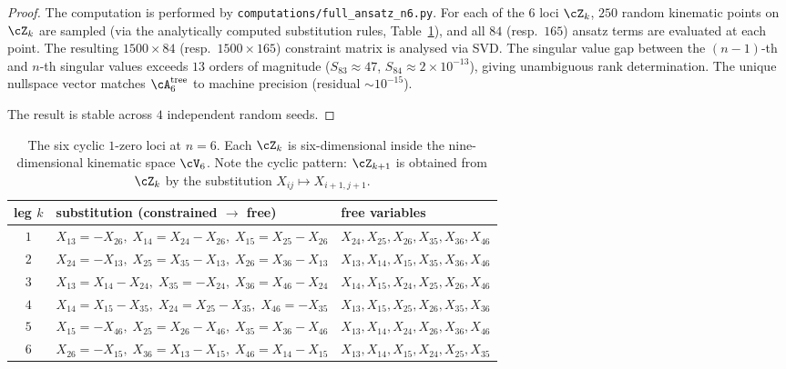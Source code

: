 \begin{proof}
The computation is performed by
\texttt{computations/full\_ansatz\_n6.py}. For each of the
$6$ loci $\cZ_k$, $250$ random kinematic points on $\cZ_k$
are sampled (via the analytically computed substitution
rules, Table~\ref{tab:loci6}), and all $84$ (resp.\ $165$)
ansatz terms are evaluated at each point. The resulting
$1500 \times 84$ (resp.\ $1500 \times 165$) constraint
matrix is analysed via SVD. The singular value gap between
the $(n{-}1)$-th and $n$-th singular values exceeds $13$
orders of magnitude ($S_{83} \approx 47$, $S_{84} \approx
2 \times 10^{-13}$), giving unambiguous rank determination.
The unique nullspace vector matches $\cA_6^{\mathrm{tree}}$
to machine precision (residual $\sim 10^{-15}$).

The result is stable across $4$ independent random seeds.
\end{proof}

\begin{table}[h]
\centering
\small
\begin{tabular}{c|l|l}
\toprule
leg $k$ & substitution (constrained $\to$ free) & free variables \\
\midrule
$1$ & $X_{13}=-X_{26},\; X_{14}=X_{24}-X_{26},\; X_{15}=X_{25}-X_{26}$
    & $X_{24},X_{25},X_{26},X_{35},X_{36},X_{46}$ \\
$2$ & $X_{24}=-X_{13},\; X_{25}=X_{35}-X_{13},\; X_{26}=X_{36}-X_{13}$
    & $X_{13},X_{14},X_{15},X_{35},X_{36},X_{46}$ \\
$3$ & $X_{13}=X_{14}-X_{24},\; X_{35}=-X_{24},\; X_{36}=X_{46}-X_{24}$
    & $X_{14},X_{15},X_{24},X_{25},X_{26},X_{46}$ \\
$4$ & $X_{14}=X_{15}-X_{35},\; X_{24}=X_{25}-X_{35},\; X_{46}=-X_{35}$
    & $X_{13},X_{15},X_{25},X_{26},X_{35},X_{36}$ \\
$5$ & $X_{15}=-X_{46},\; X_{25}=X_{26}-X_{46},\; X_{35}=X_{36}-X_{46}$
    & $X_{13},X_{14},X_{24},X_{26},X_{36},X_{46}$ \\
$6$ & $X_{26}=-X_{15},\; X_{36}=X_{13}-X_{15},\; X_{46}=X_{14}-X_{15}$
    & $X_{13},X_{14},X_{15},X_{24},X_{25},X_{35}$ \\
\bottomrule
\end{tabular}
\caption{The six cyclic $1$-zero loci at $n=6$. Each $\cZ_k$ is
six-dimensional inside the nine-dimensional kinematic space $\cV_6$.
Note the cyclic pattern: $\cZ_{k+1}$ is obtained from $\cZ_k$ by the
substitution $X_{ij} \mapsto X_{i+1,j+1}$.}
\label{tab:loci6}
\end{table}

